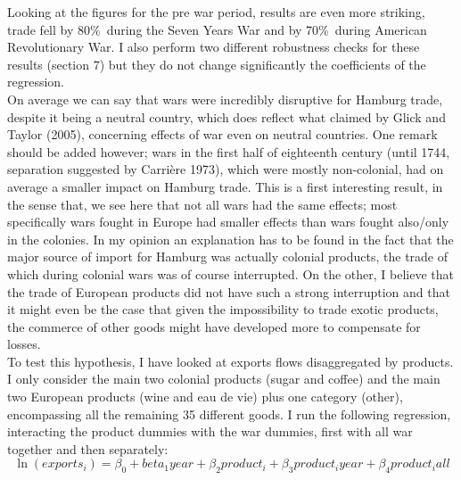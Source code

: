 \documentclass[12pt,a4paper,titlepage]{article}
\begin{document}
Looking at the figures for the pre war period, results are even more striking, trade fell by 80\%\ during the Seven Years War and by 70\%\ during American Revolutionary War. I also perform two different robustness checks for these results (section 7) but they do not change significantly the coefficients of the regression. \\
On average we can say that wars were incredibly disruptive for Hamburg trade, despite it being a neutral country, which does reflect what claimed by Glick and Taylor (2005), concerning effects of war even on neutral countries. One remark should be added however; wars in the first half of eighteenth century (until 1744, separation suggested by Carrière 1973), which were mostly non-colonial, had on average a smaller impact on Hamburg trade. This is a first interesting result, in the sense that, we see here that not all wars had the same effects; most specifically wars fought in Europe had smaller effects than wars fought also/only in the colonies. In my opinion an explanation has to be found in the fact that the major source of import for Hamburg was actually colonial products, the trade of which during colonial wars was of course interrupted. On the other, I believe that the trade of European products did not have such a strong interruption and that it might even be the case that given the impossibility to trade exotic products, the commerce of other goods might have developed more to compensate for losses. \\
To test this hypothesis, I have looked at exports flows disaggregated by products. I only consider the main two colonial products (sugar and coffee) and the main two European products (wine and eau de vie) plus one category (other), encompassing all the remaining 35 different goods. I run the following regression, interacting the product dummies with the war dummies, first with all war together and then separately:
\begin{equation}
\ln(exports_i)=\beta_0+beta_1year+\beta_2product_i + \beta_3product_iyear+\beta_4product_iall
\end{equation}

\end{document}
